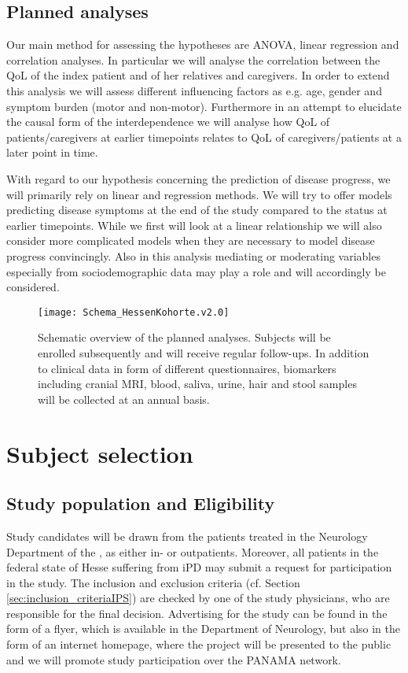 \subsection{Planned analyses}
Our main method for assessing the hypotheses are \ac{ANOVA}, linear regression and correlation analyses. In particular we will analyse the correlation between the \ac{QoL} of the index patient and of her relatives and caregivers. In order to extend this analysis we will assess different influencing factors as e.g. age, gender and symptom burden (motor and non-motor). Furthermore in an attempt to elucidate the causal form of the interdependence we will analyse how \ac{QoL} of patients/caregivers at earlier timepoints relates to \ac{QoL} of caregivers/patients at a later point in time.

With regard to our hypothesis concerning the prediction of disease progress, we will primarily rely on linear and regression methods. We will try to offer models predicting disease symptoms at the end of the study compared to the status at earlier timepoints. While we first will look at a linear relationship we will also consider more complicated models when they are necessary to model disease progress convincingly. Also in this analysis mediating or moderating variables especially from sociodemographic data may play a role and will accordingly be considered.

\begin{figure}[h]
\label{fig2:scheme}
\centering
\texttt{[image: Schema\_HessenKohorte.v2.0]}
\caption{Schematic overview of the planned analyses. Subjects will be enrolled subsequently and will receive regular follow-ups. In addition to clinical data in form of different questionnaires, biomarkers including cranial \ac{MRI}, blood, saliva, urine, hair and stool samples will be collected at an annual basis.}
\end{figure}


\section{Subject selection}
\label{sec:study_selection}
\subsection{Study population and Eligibility}
\label{sec:study_population}
Study candidates will be drawn from the patients treated in the Neurology Department of the \UKM, as either in- or outpatients. Moreover, all patients in the federal state of Hesse suffering from \ac{iPD} may submit a request for participation in the study. The inclusion and exclusion criteria (cf. Section \ref{sec:inclusion_criteriaIPS}) are checked by one of the study physicians, who are responsible for the final decision. Advertising for the study can be found in the form of a flyer, which is available in the Department of Neurology, but also in the form of an internet homepage, where the project will be presented to the public and we will promote study participation over the \ac{PANAMA} network.

